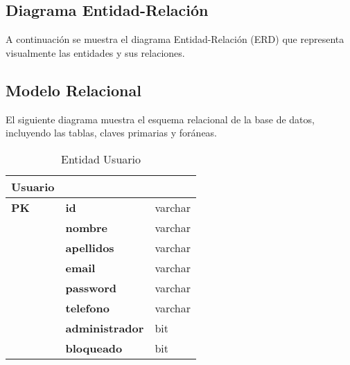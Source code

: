 \newpage

\subsection{Diagrama Entidad-Relación}

A continuación se muestra el diagrama Entidad-Relación (ERD) que representa visualmente las entidades y sus relaciones.


\newpage

\subsection{Modelo Relacional}

El siguiente diagrama muestra el esquema relacional de la base de datos, incluyendo las tablas, claves primarias y foráneas.


\newpage

\begin{table}[H]
	\centering
	\begin{tabularx}{\linewidth}{ p{} p{} p{} }
		\toprule
		\textbf{Usuario} &                          & \\
		\toprule
		\textbf{PK}      & \textbf{id}              & varchar \\
		\toprule
						 & \textbf{nombre}          & varchar \\
						 & \textbf{apellidos}       & varchar \\
						 & \textbf{email}           & varchar \\
						 & \textbf{password}        & varchar \\
						 & \textbf{telefono}        & varchar \\
						 & \textbf{administrador}   & bit \\
						 & \textbf{bloqueado}       & bit \\
		\bottomrule
	\end{tabularx}
	\caption{Entidad Usuario}
	\label{dd:usuario}
\end{table}

